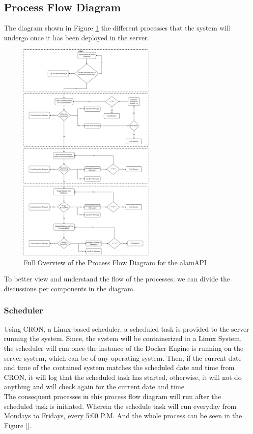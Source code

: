 \subsection{Process Flow Diagram}
\label{subsec:process_flow}
The diagram shown in Figure \ref{fig:process_flowchart} the different processes 
that the system will undergo once it has been deployed in the server.

\begin{figure}[ht]
    \centering
    \includegraphics[width=0.6\textwidth]{./assets/ProcessFlowchart.png}
    \caption{Full Overview of the Process Flow Diagram for the alamAPI}
    \label{fig:process_flowchart}
\end{figure}
\FloatBarrier

To better view and understand the flow of the processes, 
we can divide the discussions per components in the diagram.
\subsubsection{Scheduler}
\label{subsubsc:scheduler}
Using CRON, a Linux-based scheduler, a 
scheduled task is provided to the server running the system. Since, 
the system will be containerized in a Linux System, the scheduler will 
run once the instance of the Docker Engine is running on the server system, 
which can be of any operating system. Then, if the current date and time of 
the contained system matches the scheduled date and time from CRON, it will 
log that the scheduled task has started, otherwise, it will not do anything 
and will check again for the current date and time.
\vspace{0.5cm}
\\The consequent processes in this process flow diagram will run after the 
scheduled task is initiated. Wherein the schedule task will run everyday from 
Mondays to Fridays, every 5:00 P.M. And the whole process can be seen in the 
Figure \ref{}.

